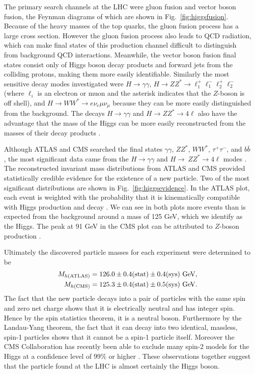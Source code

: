 The primary search channels at the LHC were gluon fusion and vector boson
fusion, the Feynman diagrams of which are shown in Fig.~\ref{fig:higgsfusion}. 
Because of the 
heavy masses of the top quarks, the gluon fusion process has a large cross 
section. However the gluon fusion process also leads to QCD radiation, which 
can make final states of this production channel difficult to distinguish from 
background QCD interactions. Meanwhile, the vector boson fusion final states 
consist only of Higgs boson decay products and forward jets from the colliding 
protons, making them more easily identifiable. Similarly the most
sensitive decay modes investigated were $H\to\gamma\gamma$, $H\to ZZ^{*}\to
\ell_{1}^{+}\ell_{1}^{-}\ell_{2}^{+}\ell_{2}^{-}$ (where $\ell_i$ is an 
electron or muon and the asterisk indicates that the $Z$-boson is off 
shell), and
$H\to WW^{*}\to e\nu_{e}\mu\nu_{\mu}$ because they can be more easily
distinguished from the background. The decays $H\to\gamma\gamma$ 
and $H\to ZZ^{*}\to4\ell$ also have the advantage that the mass of the Higgs 
can be more easily reconstructed from the masses of their decay products
\cite{dittmaier_higgs_2013}.

Although ATLAS and CMS searched the final states $\gamma\gamma$, $ZZ^{*}$,
$WW^{*}$, $\tau^{+}\tau^{-}$, and $b\bar{b}$, the most significant data came
from the $H\to \gamma\gamma$ and $H\to\ ZZ^{*}\to4\ell$ modes \cite{thomson_modern_2013}.
The reconstructed invariant mass distributions from ATLAS and CMS provided
statistically credible evidence for the existence of a new particle. Two
of the most significant distributions are shown in 
Fig.~\ref{fig:higgsevidence}. In the ATLAS plot,
each event is weighted with the probability that it is kinematically compatible
with Higgs production and decay \cite{thomson_modern_2013}. We can see in both plots more events
than is expected from the background around a mass of 125 GeV, which we
identify as the Higgs. The peak at 91 GeV in the CMS plot can be attributed
to $Z$-boson production \cite{thomson_modern_2013}. 

Ultimately the discovered particle masses for each experiment were determined 
\cite{dittmaier_higgs_2013} to be
\begin{equation}
  \begin{aligned}
  M_{h({\rm ATLAS})}&=126.0\pm0.4(\text{stat})
                \pm0.4(\text{sys})\ \text{GeV}, \\
  M_{h({\rm CMS})}&=125.3\pm0.4(\text{stat})\pm0.5(\text{sys})\ \text{GeV}.
  \end{aligned}
\end{equation}
The fact that the new particle decays into a pair of particles with the same
spin and zero net charge shows that it is electrically neutral and has
integer spin. Hence by the spin statistics theorem, it is a neutral boson.
Furthermore by the Landau-Yang theorem, the fact that it can decay into two 
identical, massless, spin-1 particles shows that it cannot be a spin-1 particle
itself. Moreover the CMS Collaboration has recently been able to exclude many
spin-2 models for the Higgs at a confidence level of 99\% or higher 
\cite{khachatryan_constraints_2015}.
These observations together suggest that the particle found at the LHC is 
almost certainly the Higgs boson.

